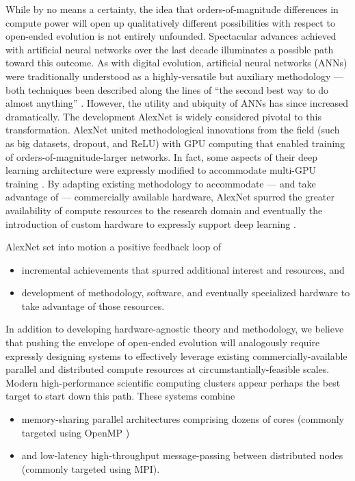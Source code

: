 
While by no means a certainty, the idea that orders-of-magnitude differences in compute power will open up qualitatively different possibilities with respect to open-ended evolution is not entirely unfounded.
Spectacular advances achieved with artificial neural networks over the last decade illuminates a possible path toward this outcome.
As with digital evolution, artificial neural networks (ANNs) were traditionally understood as a highly-versatile but auxiliary methodology --- both techniques been described along the lines of ``the second best way to do almost anything'' \citep{miaoulis2008intelligent, eiben2015introduction}.
However, the utility and ubiquity of ANNs has since increased dramatically.
The development AlexNet is widely considered pivotal to this transformation.
AlexNet united methodological innovations from the field (such as big datasets, dropout, and ReLU) with GPU computing that enabled training of orders-of-magnitude-larger networks.
In fact, some aspects of their deep learning architecture were expressly modified to accommodate multi-GPU training \citep{krizhevsky2012imagenet}.
By adapting existing methodology to accommodate --- and take advantage of --- commercially available hardware, AlexNet spurred the greater availability of compute resources to the research domain and eventually the introduction of custom hardware to expressly support deep learning \citep{jouppi2017datacenter}.

AlexNet set into motion a positive feedback loop of
\begin{itemize}
\item incremental achievements that spurred additional interest and resources, and
\item development of methodology, software, and eventually specialized hardware to take advantage of those resources.
\end{itemize}
In addition to developing hardware-agnostic theory and methodology, we believe that pushing the envelope of open-ended evolution will analogously require expressly designing systems to effectively leverage existing commercially-available parallel and distributed compute resources at circumstantially-feasible scales.
Modern high-performance scientific computing clusters appear perhaps the best target to start down this path.
These systems combine
\begin{itemize}
\item memory-sharing parallel architectures comprising dozens of cores (commonly targeted using OpenMP \citep{dagum1998openmp})
\item and low-latency high-throughput message-passing between distributed nodes (commonly targeted using MPI\citep{clarke1994mpi}).
\end{itemize}

